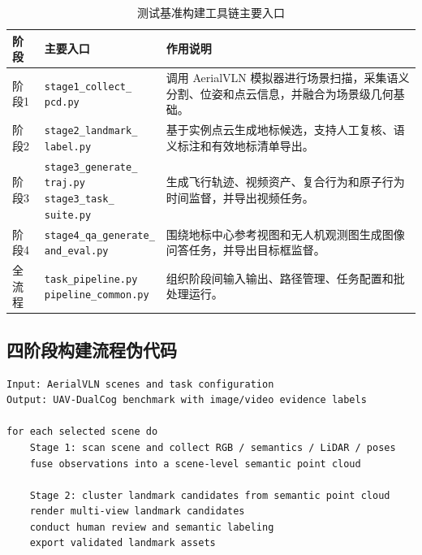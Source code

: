 \begin{thesisappendix}
\begin{table}[htbp]
    \centering
    \caption{测试基准构建工具链主要入口}
    \label{tab:app-toolchain}
    \scriptsize
    \begin{tabularx}{\textwidth}{@{}p{1.7cm}p{3.8cm}X@{}}
        \toprule
        阶段 & 主要入口 & 作用说明 \\
        \midrule
        阶段1 & \makecell[l]{\texttt{stage1\_collect\_}\\\texttt{pcd.py}} & 调用 AerialVLN 模拟器进行场景扫描，采集语义分割、位姿和点云信息，并融合为场景级几何基础。 \\
        阶段2 & \makecell[l]{\texttt{stage2\_landmark\_}\\\texttt{label.py}} & 基于实例点云生成地标候选，支持人工复核、语义标注和有效地标清单导出。 \\
        阶段3 & \makecell[l]{\texttt{stage3\_generate\_}\\\texttt{traj.py}\\\texttt{stage3\_task\_}\\\texttt{suite.py}} & 生成飞行轨迹、视频资产、复合行为和原子行为时间监督，并导出视频任务。 \\
        阶段4 & \makecell[l]{\texttt{stage4\_qa\_generate\_}\\\texttt{and\_eval.py}} & 围绕地标中心参考视图和无人机观测图生成图像问答任务，并导出目标框监督。 \\
        全流程 & \makecell[l]{\texttt{task\_pipeline.py}\\\texttt{pipeline\_common.py}} & 组织阶段间输入输出、路径管理、任务配置和批处理运行。 \\
        \bottomrule
    \end{tabularx}
\end{table}

\subsection{四阶段构建流程伪代码}

\begin{verbatim}
Input: AerialVLN scenes and task configuration
Output: UAV-DualCog benchmark with image/video evidence labels

for each selected scene do
    Stage 1: scan scene and collect RGB / semantics / LiDAR / poses
    fuse observations into a scene-level semantic point cloud

    Stage 2: cluster landmark candidates from semantic point cloud
    render multi-view landmark candidates
    conduct human review and semantic labeling
    export validated landmark assets


\end{verbatim}
\end{thesisappendix}

